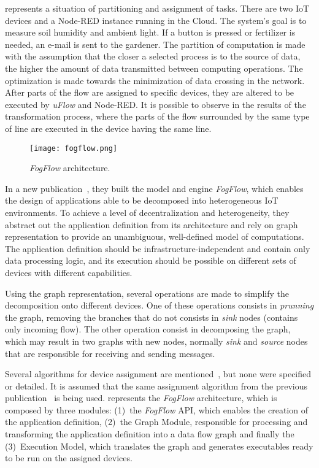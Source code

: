  represents a situation of partitioning and assignment of tasks. There are two IoT devices and a Node-RED instance running in the Cloud. The system's goal is to measure soil humidity and ambient light. If a button is pressed or fertilizer is needed, an e-mail is sent to the gardener. The partition of computation is made with the assumption that the closer a selected process is to the source of data, the higher the amount of data transmitted between computing operations. The optimization is made towards the minimization of data crossing in the network. After parts of the flow are assigned to specific devices, they are altered to be executed by \textit{uFlow} and Node-RED. It is possible to observe in  the results of the transformation process, where the parts of the flow surrounded by the same type of line are executed in the device having the same line.

\begin{figure}[h]
\centering
\texttt{[image: fogflow.png]}
\caption[\textit{FogFlow} architecture]{\textit{FogFlow} architecture\cite{fog_flow}.}\label{fig:fogflow}
\end{figure}
    
In a new publication~\cite{fog_flow}, they built the model and engine \textit{FogFlow}, which enables the design of applications able to be decomposed into heterogeneous IoT environments. To achieve a level of decentralization and heterogeneity, they abstract out the application definition from its architecture and rely on graph representation to provide an unambiguous, well-defined model of computations. The application definition should be infrastructure-independent and contain only data processing logic, and its execution should be possible on different sets of devices with different capabilities.

Using the graph representation, several operations are made to simplify the decomposition onto different devices. One of these operations consists in \textit{prunning} the graph, removing the branches that do not consists in \textit{sink} nodes (contains only incoming flow). The other operation consist in decomposing the graph, which may result in two graphs with new nodes, normally \textit{sink} and \textit{source} nodes that are responsible for receiving and sending messages. 

Several algorithms for device assignment are mentioned~\cite{algorithm_fog,ifogsim}, but none were specified or detailed. It is assumed that the same assignment algorithm from the previous publication~\cite{flow_based_programming_fog} is being used.  represents the \textit{FogFlow} architecture, which is composed by three modules: (1)~the \textit{FogFlow} API, which enables the creation of the application definition, (2)~the Graph Module, responsible for processing and transforming the application definition into a data flow graph and finally the (3)~Execution Model, which translates the graph and generates executables ready to be run on the assigned devices.

